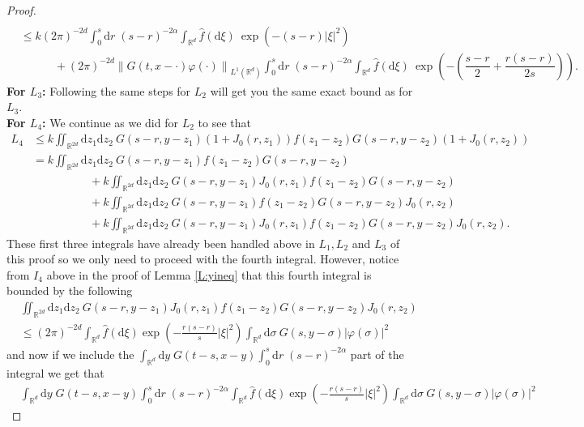 \documentclass[a4paper,11pt]{article}
\numberwithin{equation}{section}
\theoremstyle{plain}
\theoremstyle{definition}
\newcommand{\R}{\mathbb{R}}
\newcommand{\Norm}[1]{\left\|  #1   \right\|}
\newcommand{\ud}{\ensuremath{\mathrm{d}}}
\begin{document}
\begin{proof}
\begin{align*}
	\\ & \le k  (2\pi)^{-2d}\int_0^s\ud r\; (s-r)^{-2\alpha}\int_{\R^d}\hat f (\ud \xi)\: \exp(-(s-r)|\xi|^2)
	\\ & \hspace{3em}+ (2\pi)^{-2d}  \Norm{G(t,x-\cdot)\varphi(\cdot)}_{L^1(\R^d)}\int_0^s\ud r\; (s-r)^{-2\alpha}\int_{\R^d}\hat f(\ud \xi) \: \exp\left(-\left(\dfrac{s-r}{2}+\dfrac{r(s-r)}{2s}\right)\right).
\end{align*}
\noindent \textbf{For $L_3$:} Following the same steps for $L_2$ will get you the same exact bound as for $L_3$. \\ 

\noindent \textbf{For $L_4$:} We continue as we did for $L_2$ to see that 
\begin{align*}
L_4 &\le k\iint_{\R^{2d}}\ud z_1 \ud z_2\:G(s-r,y-z_1)(1+J_0(r,z_1))f(z_1-z_2)G(s-r,y-z_2)(1+J_0(r,z_2))
\\&= k\iint_{\R^{2d}}\ud z_1 \ud z_2\:G(s-r,y-z_1)f(z_1-z_2)G(s-r,y-z_2)
\\&\hspace{5em}+k\iint_{\R^{2d}}\ud z_1 \ud z_2\:G(s-r,y-z_1)J_0(r,z_1)f(z_1-z_2)G(s-r,y-z_2)
\\&\hspace{5em}+ k\iint_{\R^{2d}}\ud z_1 \ud z_2\:G(s-r,y-z_1)f(z_1-z_2)G(s-r,y-z_2)J_0(r,z_2)
\\&\hspace{5em}+k\iint_{\R^{2d}}\ud z_1 \ud z_2\:G(s-r,y-z_1)J_0(r,z_1)f(z_1-z_2)G(s-r,y-z_2)J_0(r,z_2).
\end{align*}
These first three integrals have already been handled above in $L_1, L_2$ and $L_3$ of this proof so we only need to proceed with the fourth integral. However, notice from $I_4$ above in the proof of Lemma \ref{L:yineq} that this fourth integral is bounded by the following
\begin{align*}
&\iint_{\R^{2d}}\ud z_1 \ud z_2\:G(s-r,y-z_1)J_0(r,z_1)f(z_1-z_2)G(s-r,y-z_2)J_0(r,z_2)
\\ &\le (2\pi)^{-2d}\int_{\R^d} \hat{f}(\ud \xi)\exp\left(-\frac{r(s-r)}{s}|\xi|^2\right) \int_{\R^{d}}\ud \sigma\:G(s,y-\sigma)|\varphi(\sigma)|^2
\end{align*} 
and now if we include the $\int_{\R^d}\ud y \;G(t-s,x-y)\int_0^s\ud r\; (s-r)^{-2\alpha}$ part of the integral we get that
\begin{align*}
&\int_{\R^d}\ud y \;G(t-s,x-y)\int_0^s\ud r\; (s-r)^{-2\alpha}\int_{\R^d} \hat{f}(\ud \xi)\exp\left(-\frac{r(s-r)}{s}|\xi|^2\right) \int_{\R^{d}}\ud \sigma\:G(s,y-\sigma)|\varphi(\sigma)|^2

\end{align*}
\end{proof}
\end{document}
